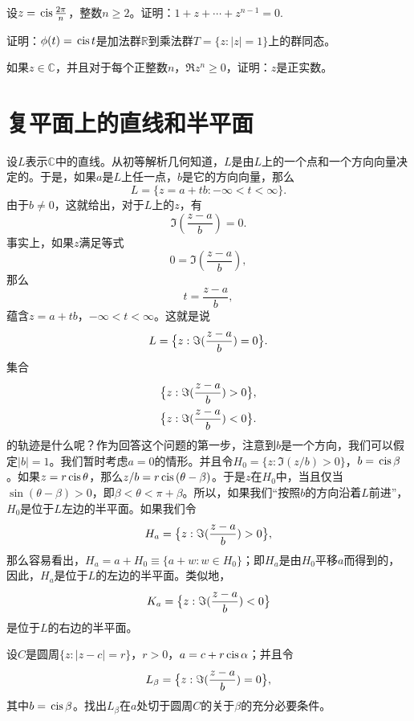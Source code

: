 \begin{exercise}
设$z=\,\text{cis}\,{\frac{2\pi}{n}}$，整数$n \ge 2$。证明：$1+z+\cdots+z^{n-1}=0$.
\end{exercise}

\begin{exercise}
证明：$\phi(t)=\,\text{cis}\,{t}$是加法群$\mathbb{R}$到乘法群$T=\{z:|z|=1\}$上的群同态。
\end{exercise}

\begin{exercise}
如果$z \in \mathbb{C}$，并且对于每个正整数$n$，$\Re{z^n} \ge 0$，证明：$z$是正实数。
\end{exercise}

\section{复平面上的直线和半平面}\label{subsection0020105}
设$L$表示$\mathbb{C}$中的直线。从初等解析几何知道，$L$是由$L$上的一个点和一个方向向量决定的。于是，如果$a$是$L$上任一点，$b$是它的方向向量，那么
\[
L = \{z = a+tb:-\infty < t < \infty\}.
\]
由于$b \neq 0$，这就给出，对于$L$上的$z$，有
\[
\Im{(\frac{z-a}{b})} = 0.
\]
事实上，如果$z$满足等式
\[
0 = \Im{(\frac{z-a}{b})},
\]
那么
\[
t = \frac{z-a}{b},
\]
蕴含$z = a + tb$，$-\infty < t < \infty$。这就是说
\begin{gather}\label{equ002010501}
L = \big{\{} z: \Im{(\frac{z-a}{b})} = 0 \big{\}}.
\end{gather}
集合
\[
\begin{aligned}
&\big{\{} z: \Im{(\frac{z-a}{b})} > 0 \big{\}},\\
&\big{\{} z: \Im{(\frac{z-a}{b})} < 0 \big{\}}.
\end{aligned}
\]
的轨迹是什么呢？作为回答这个问题的第一步，注意到$b$是一个方向，我们可以假定$|b|=1$。我们暂时考虑$a=0$的情形。并且令$H_0=\{z:\Im{(z/b)}>0\}$，$b = \,\text{cis}\,{\beta}$。如果$z = r\,\text{cis}\,{\theta}$，那么$z/b = r\,\text{cis}\,{(\theta-\beta)}$。于是$z$在$H_0$中，当且仅当$\sin(\theta-\beta)>0$，即$\beta < \theta < \pi + \beta$。所以，如果我们“按照$b$的方向沿着$L$前进”，$H_0$是位于$L$左边的半平面。如果我们令
\[
H_a = \big{\{} z: \Im{(\frac{z-a}{b})} > 0 \big{\}},
\]
那么容易看出，$H_a = a + H_0 \equiv \{ a + w: w \in H_0\}$；即$H_a$是由$H_0$平移$a$而得到的，因此，$H_a$是位于$L$的左边的半平面。类似地，
\[
K_a = \big{\{} z: \Im{(\frac{z-a}{b})} < 0 \big{\}}
\]
是位于$L$的右边的半平面。

\begin{exercise}
设$C$是圆周$\{z:|z-c|=r\}$，$r > 0$，$a = c + r\,\text{cis}\,{\alpha}$；并且令
\[
L_{\beta} = \big{\{} z: \Im{(\frac{z-a}{b})} = 0 \big{\}},
\]
其中$b=\,\text{cis}\,{\beta}$。找出$L_{\beta}$在$a$处切于圆周$C$的关于$\beta$的充分必要条件。
\end{exercise}

